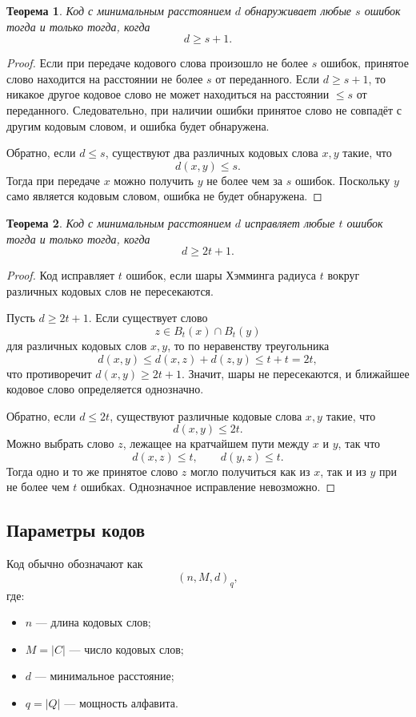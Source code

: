 \documentclass[12pt,a4paper]{article}
\newtheorem{theorem}{Теорема}[section]
\begin{document}
\begin{theorem}
Код с минимальным расстоянием $d$ обнаруживает любые $s$ ошибок тогда и только тогда, когда
\[
    d\ge s+1.
\]
\end{theorem}

\begin{proof}
Если при передаче кодового слова произошло не более $s$ ошибок, принятое слово находится на расстоянии не более $s$ от переданного.
Если $d\ge s+1$, то никакое другое кодовое слово не может находиться на расстоянии $\le s$ от переданного.
Следовательно, при наличии ошибки принятое слово не совпадёт с другим кодовым словом, и ошибка будет обнаружена.

Обратно, если $d\le s$, существуют два различных кодовых слова $x,y$ такие, что
\[
    d(x,y)\le s.
\]
Тогда при передаче $x$ можно получить $y$ не более чем за $s$ ошибок.
Поскольку $y$ само является кодовым словом, ошибка не будет обнаружена.
\end{proof}

\begin{theorem}
Код с минимальным расстоянием $d$ исправляет любые $t$ ошибок тогда и только тогда, когда
\[
    d\ge 2t+1.
\]
\end{theorem}

\begin{proof}
Код исправляет $t$ ошибок, если шары Хэмминга радиуса $t$ вокруг различных кодовых слов не пересекаются.

Пусть $d\ge 2t+1$.
Если существует слово
\[
    z\in B_t(x)\cap B_t(y)
\]
для различных кодовых слов $x,y$, то по неравенству треугольника
\[
    d(x,y)\le d(x,z)+d(z,y)\le t+t=2t,
\]
что противоречит $d(x,y)\ge 2t+1$.
Значит, шары не пересекаются, и ближайшее кодовое слово определяется однозначно.

Обратно, если $d\le 2t$, существуют различные кодовые слова $x,y$ такие, что
\[
    d(x,y)\le 2t.
\]
Можно выбрать слово $z$, лежащее на кратчайшем пути между $x$ и $y$, так что
\[
    d(x,z)\le t,\qquad d(y,z)\le t.
\]
Тогда одно и то же принятое слово $z$ могло получиться как из $x$, так и из $y$ при не более чем $t$ ошибках.
Однозначное исправление невозможно.
\end{proof}

\subsection{Параметры кодов}

Код обычно обозначают как
\[
    (n,M,d)_q,
\]
где:
\begin{itemize}
    \item $n$ --- длина кодовых слов;
    \item $M=|C|$ --- число кодовых слов;
    \item $d$ --- минимальное расстояние;
    \item $q=|Q|$ --- мощность алфавита.
\end{itemize}
\end{document}
